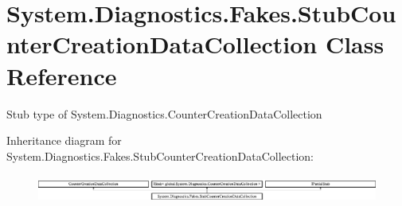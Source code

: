 \hypertarget{class_system_1_1_diagnostics_1_1_fakes_1_1_stub_counter_creation_data_collection}{\section{System.\-Diagnostics.\-Fakes.\-Stub\-Counter\-Creation\-Data\-Collection Class Reference}
\label{class_system_1_1_diagnostics_1_1_fakes_1_1_stub_counter_creation_data_collection}
}


Stub type of System.\-Diagnostics.\-Counter\-Creation\-Data\-Collection 


Inheritance diagram for System.\-Diagnostics.\-Fakes.\-Stub\-Counter\-Creation\-Data\-Collection\-:\begin{figure}[H]
\begin{center}
\leavevmode
\includegraphics[height=0.938023cm]{class_system_1_1_diagnostics_1_1_fakes_1_1_stub_counter_creation_data_collection}
\end{center}
\end{figure}

